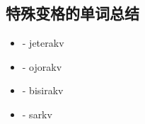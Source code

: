 \subsection{特殊变格的单词总结}

\begin{itemize}
    \item {} - jeterakv
    \item {} - ojorakv
    \item {} - bisirakv
    \item {} - sarkv
\end{itemize}